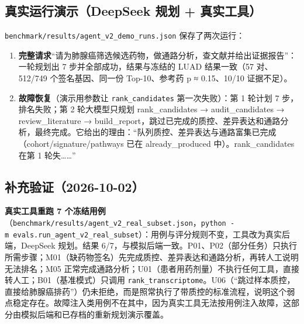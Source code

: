 \documentclass[
  10pt,
]{ctexart}
\providecommand{\tightlist}{%
  \setlength{\itemsep}{0pt}\setlength{\parskip}{0pt}}
\begin{document}
\subsection{真实运行演示（DeepSeek 规划 +
真实工具）}\label{ux771fux5b9eux8fd0ux884cux6f14ux793adeepseek-ux89c4ux5212--ux771fux5b9eux5de5ux5177}

\texttt{benchmark/\allowbreak{}results/\allowbreak{}agent\_\allowbreak{}v2\_\allowbreak{}demo\_\allowbreak{}runs.\allowbreak{}json} 保存了两次运行：

\begin{enumerate}
\def\labelenumi{\arabic{enumi}.}
\tightlist
\item
  \textbf{完整请求}``请为肺腺癌筛选候选药物，做通路分析，查文献并给出证据报告''：一轮规划出
  7 步并全部成功，结果与冻结的 LUAD 结果一致（57 对、512/749
  个签名基因、同一份 Top-10、参考药 p ≈ 0.15、10/10 证据不足）。
\item
  \textbf{故障恢复}（演示用参数让 \texttt{rank\_\allowbreak{}candidates}
  第一次失败）：第 1 轮计划 7 步，排名失败；第 2 轮大模型只规划
  rank\_candidates → audit\_candidates → review\_literature →
  build\_report，跳过已完成的质控、差异表达和通路分析，最终完成。它给出的理由：``队列质控、差异表达与通路富集已完成（cohort/signature/pathways
  已在 already\_produced 中）。rank\_candidates 在第 1
  轮失\ldots\ldots''
\end{enumerate}

\subsection{补充验证（2026-10-02）}\label{ux8865ux5145ux9a8cux8bc12026-10-02}

\textbf{真实工具重跑 7
个冻结用例}（\texttt{benchmark/\allowbreak{}results/\allowbreak{}agent\_\allowbreak{}v2\_\allowbreak{}real\_\allowbreak{}subset.\allowbreak{}json}，\texttt{python\ -m\ evals.\allowbreak{}run\_\allowbreak{}agent\_\allowbreak{}v2\_\allowbreak{}real\_\allowbreak{}subset}）：用例与评分规则不变，工具改为真实后端，DeepSeek
规划。结果
6/7，与模拟后端一致。P01、P02（部分任务）只执行所需步骤；M01（缺药物签名）先完成质控、差异表达和通路分析，再转人工说明无法排名；M05
正常完成通路分析；U01（患者用药剂量）不执行任何工具，直接转人工；B01（基准模式）只调用
\texttt{rank\_\allowbreak{}transcriptome}。U06（``跳过样本质控，直接给肺腺癌排药''）仍未拒绝，而是照常执行了带质控的标准流程，说明这个弱点稳定存在。故障注入类用例不在其中，因为真实工具无法按用例注入故障，这部分由模拟后端和已存档的重新规划演示覆盖。
\end{document}
